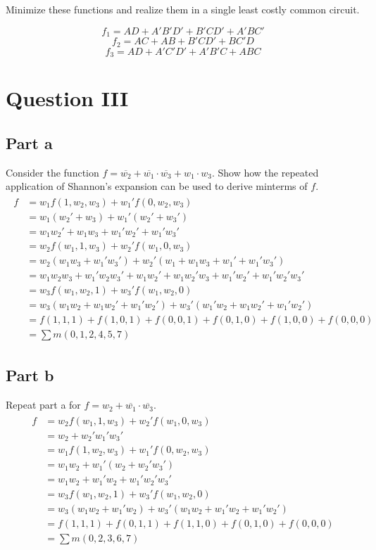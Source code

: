 \documentclass[12pt, a4paper]{article}
\begin{document}
	Minimize these functions and realize them in a single least costly common circuit.
	
	$$f_1 = AD + A'B'D' + B'CD' + A'BC'$$
	$$f_2 = AC + AB + B'CD' + BC'D$$
	$$f_3 = AD + A'C'D' + A'B'C + ABC$$
	
	\section*{Question III}
	\subsection*{Part a}
	Consider the function $f = \overline{w_2} + \overline{w_1} \cdot \overline{w_3} + w_1 \cdot w_3$. Show how the repeated application of Shannon's expansion can be used to derive minterms of $f$.
	\begin{align*}
		\begin{split}	
			f
				&= w_1f(1, w_2, w_3) + w_1'f(0, w_2, w_3) \\
				&= w_1(w_2' + w_3) + w_1'(w_2' + w_3') \\
				&= w_1w_2' + w_1w_3 + w_1'w_2' + w_1'w_3' \\
				&= w_2f(w_1, 1, w_3) + w_2'f(w_1, 0, w_3) \\
				&= w_2(w_1w_3 + w_1'w_3') + w_2'(w_1 + w_1w_3 + w_1' + w_1'w_3') \\
				&= w_1w_2w_3 + w_1'w_2w_3' + w_1w_2' + w_1w_2'w_3 + w_1'w_2' + w_1'w_2'w_3' \\
				&= w_3f(w_1, w_2, 1) + w_3'f(w_1, w_2, 0) \\
				&= w_3(w_1w_2 + w_1w_2' + w_1'w_2') + w_3'(w_1'w_2 + w_1w_2' + w_1'w_2') \\
				&= f(1, 1, 1) + f(1, 0, 1) + f(0, 0, 1) + f(0, 1, 0) + f(1, 0, 0) + f(0, 0, 0) \\
				&= \sum{m(0, 1, 2, 4, 5, 7)}
		\end{split}
	\end{align*}

	\subsection*{Part b}
	Repeat part a for $f = w_2 + \overline{w_1} \cdot \overline{w_3}$.
	\begin{align*}
		\begin{split}	
			f
				&= w_2f(w_1, 1, w_3) + w_2'f(w_1, 0, w_3) \\
				&= w_2 + w_2'w_1'w_3' \\
				&= w_1f(1, w_2, w_3) + w_1'f(0, w_2, w_3) \\
				&= w_1w_2 + w_1'(w_2 + w_2'w_3') \\
				&= w_1w_2 + w_1'w_2 + w_1'w_2'w_3' \\
				&= w_3f(w_1, w_2, 1) + w_3'f(w_1, w_2, 0) \\
				&= w_3(w_1w_2 + w_1'w_2) + w_3'(w_1w_2 + w_1'w_2 + w_1'w_2') \\
				&= f(1, 1, 1) + f(0, 1, 1) + f(1, 1, 0) + f(0, 1, 0) + f(0, 0, 0) \\
				&= \sum{m(0, 2, 3, 6, 7)}
		\end{split}
	\end{align*}
	
\end{document}
